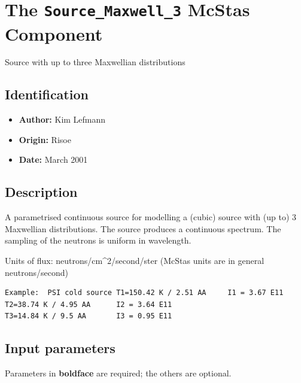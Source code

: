 \section{The \texttt{Source\_Maxwell\_3} McStas Component}
Source with up to three Maxwellian distributions

\subsection*{Identification}
\begin{itemize}
  \item \textbf{Author:} Kim Lefmann
  \item \textbf{Origin:} Risoe
  \item \textbf{Date:} March 2001
\end{itemize}

\subsection*{Description}
A parametrised continuous source for modelling a (cubic) source with (up to) 3 Maxwellian distributions. The source produces a continuous spectrum. The sampling of the neutrons is uniform in wavelength.

Units of flux: neutrons/cm\textasciicircum{}2/second/ster (McStas units are in general neutrons/second)

\begin{verbatim}
Example:  PSI cold source T1=150.42 K / 2.51 AA     I1 = 3.67 E11
T2=38.74 K / 4.95 AA      I2 = 3.64 E11
T3=14.84 K / 9.5 AA       I3 = 0.95 E11
\end{verbatim}

\subsection*{Input parameters}
Parameters in \textbf{boldface} are required; the others are optional.

